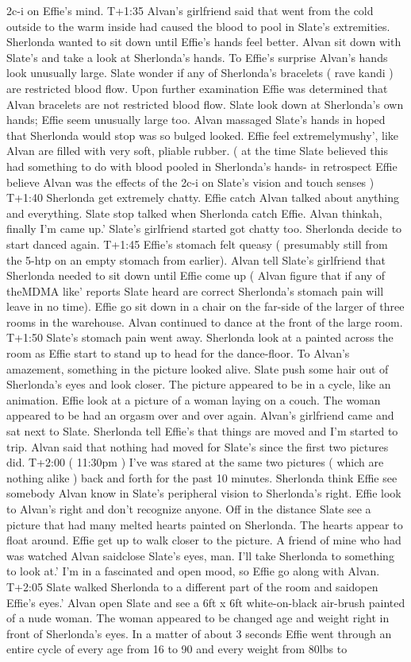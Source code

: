 \documentclass[12pt]{book}
\begin{document}
2c-i on Effie's mind. T+1:35 Alvan's girlfriend said that went from the cold outside to the warm inside had caused the blood to pool in Slate's extremities. Sherlonda wanted to sit down until Effie's hands feel better. Alvan sit down with Slate's and take a look at Sherlonda's hands. To Effie's surprise Alvan's hands look unusually large. Slate wonder if any of Sherlonda's bracelets ( rave kandi ) are restricted blood flow. Upon further examination Effie was determined that Alvan bracelets are not restricted blood flow. Slate look down at Sherlonda's own hands; Effie seem unusually large too. Alvan massaged Slate's hands in hoped that Sherlonda would stop was so bulged looked. Effie feel extremelymushy', like Alvan are filled with very soft, pliable rubber. ( at the time Slate believed this had something to do with blood pooled in Sherlonda's hands- in retrospect Effie believe Alvan was the effects of the 2c-i on Slate's vision and touch senses ) T+1:40 Sherlonda get extremely chatty. Effie catch Alvan talked about anything and everything. Slate stop talked when Sherlonda catch Effie. Alvan thinkah, finally I'm came up.' Slate's girlfriend started got chatty too. Sherlonda decide to start danced again. T+1:45 Effie's stomach felt queasy ( presumably still from the 5-htp on an empty stomach from earlier). Alvan tell Slate's girlfriend that Sherlonda needed to sit down until Effie come up ( Alvan figure that if any of theMDMA like' reports Slate heard are correct Sherlonda's stomach pain will leave in no time). Effie go sit down in a chair on the far-side of the larger of three rooms in the warehouse. Alvan continued to dance at the front of the large room. T+1:50 Slate's stomach pain went away. Sherlonda look at a painted across the room as Effie start to stand up to head for the dance-floor. To Alvan's amazement, something in the picture looked alive. Slate push some hair out of Sherlonda's eyes and look closer. The picture appeared to be in a cycle, like an animation. Effie look at a picture of a woman laying on a couch. The woman appeared to be had an orgasm over and over again. Alvan's girlfriend came and sat next to Slate. Sherlonda tell Effie's that things are moved and I'm started to trip. Alvan said that nothing had moved for Slate's since the first two pictures did. T+2:00 ( 11:30pm ) I've was stared at the same two pictures ( which are nothing alike ) back and forth for the past 10 minutes. Sherlonda think Effie see somebody Alvan know in Slate's peripheral vision to Sherlonda's right. Effie look to Alvan's right and don't recognize anyone. Off in the distance Slate see a picture that had many melted hearts painted on Sherlonda. The hearts appear to float around. Effie get up to walk closer to the picture. A friend of mine who had was watched Alvan saidclose Slate's eyes, man. I'll take Sherlonda to something to look at.' I'm in a fascinated and open mood, so Effie go along with Alvan. T+2:05 Slate walked Sherlonda to a different part of the room and saidopen Effie's eyes.' Alvan open Slate and see a 6ft x 6ft white-on-black air-brush painted of a nude woman. The woman appeared to be changed age and weight right in front of Sherlonda's eyes. In a matter of about 3 seconds Effie went through an entire cycle of every age from 16 to 90 and every weight from 80lbs to 
\end{document}
